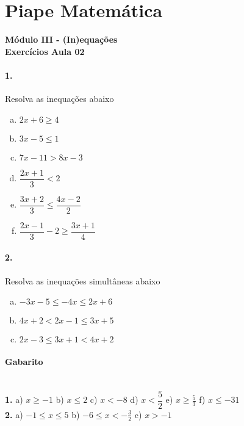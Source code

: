 \documentclass[a4paper,12pt]{article}
\begin{document}
 
  
\section*{Piape Matemática} 
\textbf{Módulo III - (In)equações}\\
\textbf{Exercícios Aula 02}         
\begin{multicols}{2}
\paragraph*{1.} Resolva as inequações abaixo
\begin{enumerate}[a)]  
    \item $2x + 6 \ge 4$
    \item $3x - 5 \le 1$
    \item $7x - 11 > 8x - 3$
    \item $\dfrac{2x+1}{3} < 2$
    \item $\dfrac{3x+2}{3} \le \dfrac{4x-2}{2}$
    \item $\dfrac{2x-1}{3} - 2 \ge \dfrac{3x+1}{4}$
\end{enumerate}

\paragraph*{2.} Resolva as inequações simultâneas abaixo

\begin{enumerate}[a)]
    \item $-3x -5 \le -4x \le 2x + 6$
    \item $4x +2 < 2x - 1 \le 3x + 5$
    \item $2x - 3 \le 3x + 1 < 4x + 2$    
\end{enumerate}

\vspace*{2cm}
\end{multicols}
 
\vspace*{\fill}
{\footnotesize
\paragraph*{Gabarito} \hspace*{\fill}\\
\textbf{1.}
 a) $x \ge -1$  b) $x \le 2$  c) $x < -8$  d) $x < \dfrac{5}{2}$  e) $x\ge \frac{5}{3}$  f) $x \le -31$\\
\textbf{2.}
    a) $ -1 \le x \le 5$ b) $-6\le x < -\frac{3}{2}$ c) $x > -1$

}
\end{document}
